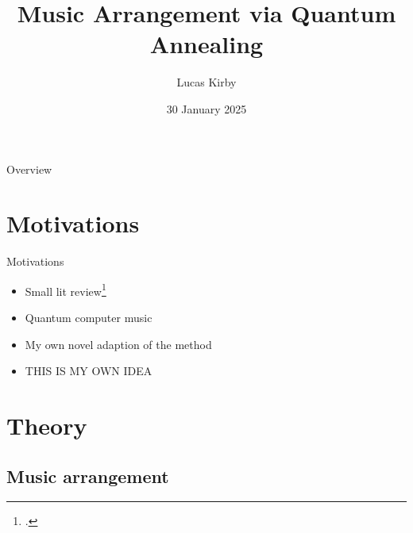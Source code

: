 \documentclass[handout]{beamer}
\title{Music Arrangement via Quantum Annealing}
\author{Lucas Kirby}
\institute{Department of Physics, Durham University}
\date{30 January 2025}
\begin{document}
\begin{frame}
    \titlepage
\end{frame}

\begin{frame}{Overview}
    \tableofcontents

\end{frame}

\section{Motivations}

\begin{frame}{Motivations}

    \begin{itemize}
        \item Small lit review\footcite{cambouropoulos_lbdm_2011}
        \item Quantum computer music
        \item My own novel adaption of the method
        \item THIS IS MY OWN IDEA
    \end{itemize}

\end{frame}

\section{Theory} %

\subsection{Music arrangement}
\end{document}
